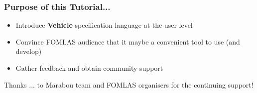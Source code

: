 \documentclass{beamer}
\begin{document}
\begin{frame}
\frametitle{Purpose of this Tutorial...}

\begin{block}{}
\begin{itemize}
\item Introduce \textbf{Vehicle} specification language at the user level
\item Convince FOMLAS audience that it maybe a convenient tool to use (and develop)
\item Gather feedback and obtain community support
\end{itemize}
\end{block}

\begin{block}{Thanks}
... to Marabou team and FOMLAS organisers for the continuing support!
\end{block}
\end{frame}
\end{document}
